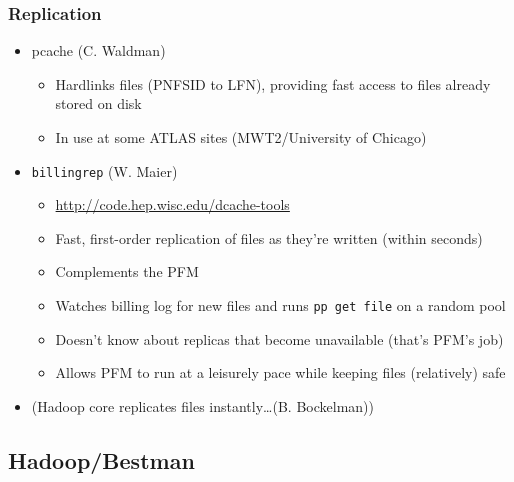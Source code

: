 \documentclass{beamer}
\begin{document}
\begin{frame}
\frametitle{Replication}
\begin{itemize}
	\item pcache (C. Waldman)
	\begin{itemize}
		\item Hardlinks files (PNFSID to LFN), providing fast access to files already stored on disk
		\item In use at some ATLAS sites (MWT2/University of Chicago)
	\end{itemize}
	\item {\tt billingrep} (W. Maier)
	\begin{itemize}
		\item \url{http://code.hep.wisc.edu/dcache-tools}
		\item Fast, first-order replication of files as they're written (within seconds)
		\item Complements the PFM
		\item Watches billing log for new files and runs {\tt pp get file} on a random pool
		\item Doesn't know about replicas that become unavailable (that's PFM's job)
		\item Allows PFM to run at a leisurely pace while keeping files (relatively) safe
	\end{itemize}
	\item {\small{(Hadoop core replicates files instantly\ldots{}(B. Bockelman))}}
\end{itemize}
\end{frame}

\subsection{Hadoop/Bestman}
\end{document}
